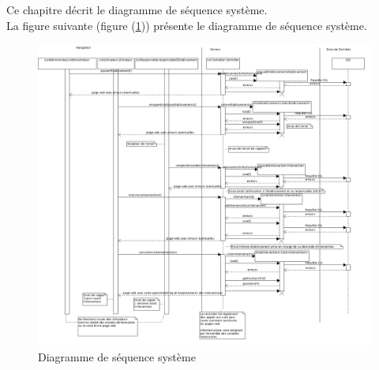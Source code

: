 
Ce chapitre décrit le diagramme de séquence système. \\

La figure suivante (figure (\ref{diagrammeSequenceSystem})) présente le diagramme de séquence système.

\begin{figure}
	\centering
	\includegraphics[scale=0.35]{images/diagrammeSequenceSysteme/diagrammeSequence.png}
	\caption{Diagramme de séquence système}
	\label{diagrammeSequenceSystem}
\end{figure}